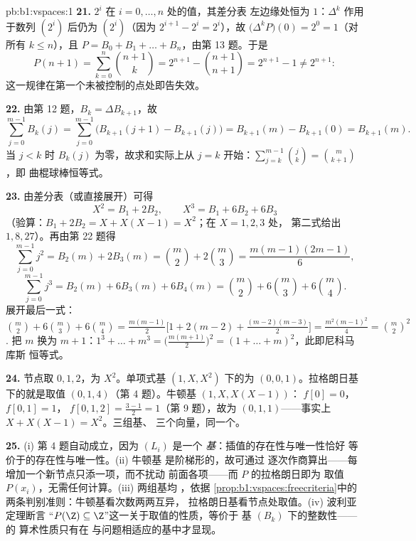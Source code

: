 \begin{solution}{pb:b1:vspaces:1}
\textbf{21.} $2^i$ 在 $i = 0, \dots, n$ 处的值，其差分表
左边缘处恒为 $1$：$\Delta^k$ 作用于数列
$(2^i)$ 后仍为 $(2^i)$（因为 $2^{i+1} - 2^i = 2^i$），故
$\bigl(\Delta^k P\bigr)(0) = 2^0 = 1$（对所有 $k \leq n$），且 $P =
B_0 + B_1 + \dots + B_n$，由第 13 题。于是
\[
P(n+1) = \sum_{k=0}^{n}\binom{n+1}{k}
= 2^{n+1} - \binom{n+1}{n+1} = 2^{n+1} - 1 \neq 2^{n+1}:
\]
这一规律在第一个未被控制的点处即告失效。

\textbf{22.} 由第 12 题，$B_k = \Delta B_{k+1}$，故
\[
\sum_{j=0}^{m-1} B_k(j)
= \sum_{j=0}^{m-1}\bigl(B_{k+1}(j+1) - B_{k+1}(j)\bigr)
= B_{k+1}(m) - B_{k+1}(0) = B_{k+1}(m).
\]
当 $j < k$ 时 $B_k(j)$ 为零，故求和实际上从
$j = k$ 开始：$\sum_{j=k}^{m-1}\binom jk = \binom m{k+1}$，即
曲棍球棒恒等式。

\textbf{23.} 由差分表（或直接展开）可得
\[
X^2 = B_1 + 2 B_2, \qquad X^3 = B_1 + 6 B_2 + 6 B_3
\]
（验算：$B_1 + 2B_2 = X + X(X-1) = X^2$；在 $X = 1, 2, 3$ 处，
第二式给出 $1, 8, 27$）。再由第 22 题得
\[
\sum_{j=0}^{m-1} j^2 = B_2(m) + 2B_3(m)
= \binom m2 + 2\binom m3 = \frac{m(m-1)(2m-1)}{6},
\]
\[
\sum_{j=0}^{m-1} j^3 = B_2(m) + 6B_3(m) + 6B_4(m)
= \binom m2 + 6\binom m3 + 6\binom m4 .
\]
展开最后一式：$\binom m2 + 6\binom m3 + 6\binom
m4 = \frac{m(m-1)}{2}\bigl[1 + 2(m-2) +
\frac{(m-2)(m-3)}{2}\bigr] = \frac{m^2(m-1)^2}{4} = \binom m2^2$.
把 $m$ 换为 $m + 1$：$1^3 + \dots + m^3 =
\bigl(\frac{m(m+1)}2\bigr)^2 = (1 + \dots + m)^2$，此即尼科马库斯
恒等式。

\textbf{24.} 节点取 $0, 1, 2$，为 $X^2$。单项式基
$(1, X, X^2)$ 下的为 $(0, 0, 1)$。拉格朗日基
下的就是取值 $(0, 1, 4)$（第 4 题）。牛顿基
$(1, X, X(X-1))$： $f[0] = 0$，$f[0,1] = 1$，
$f[0,1,2] = \frac{3 - 1}{2} = 1$（第 9 题），故为
$(0, 1, 1)$——事实上 $X + X(X-1) = X^2$。三组基、
三个向量，同一个。

\textbf{25.} (i) 第 4 题自动成立，因为 $(L_i)$ 是一个
\emph{基}：插值的存在性与唯一性恰好
等价于的存在性与唯一性。(ii) 牛顿基
是阶梯形的，故可通过
逐次作商算出——每增加一个新节点只添一项，而不扰动
前面各项——而 $P$ 的拉格朗日即为
取值 $P(x_i)$，无需任何计算。(iii) 两组基均
，依据
\cref{prop:b1:vspaces:freecriteria}中的两条判别准则：牛顿基看次数两两互异，
拉格朗日基看节点处取值。(iv) 波利亚定理断言
“$P(\Z) \subseteq \Z$”这一关于取值的性质，等价于
基 $(B_k)$ 下的整数性——的
算术性质只有在
与问题相适应的基中才显现。
\end{solution}
